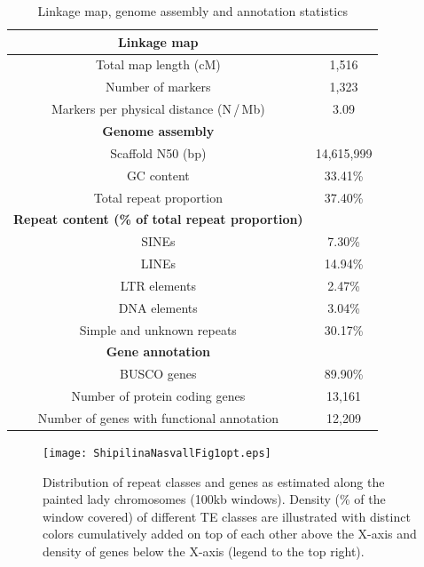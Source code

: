 \documentclass[twocolumn]{bmcart}%
\begin{document}
\begin{table}[h!]
\caption{Linkage map, genome assembly and annotation statistics}
\label{tab:1} %
  \begin{tabular}{cc}
    \hline
    \textbf{Linkage map}
     &    \\ \hline
    Total map length (cM) & 1,516 \\
    Number of markers & 1,323 \\
    Markers per physical distance (N\,/\,Mb) & 3.09  \\ \hline
      \textbf{Genome assembly}
     &    \\ \hline
   Scaffold N50 (bp) & 14,615,999 \\
   GC content & 33.41\% \\
   Total repeat proportion & 37.40\%  \\ \hline
         \textbf{Repeat content (\% of total repeat proportion)}
     &    \\ \hline
   SINEs & 7.30\% \\
   LINEs & 14.94\% \\
   LTR elements & 2.47\%  \\ 
   DNA elements & 3.04\% \\
   Simple and unknown repeats & 30.17\% \\ \hline
 \textbf{Gene annotation}  &    \\ \hline  
   BUSCO genes & 89.90\% \\
Number of protein coding genes & 13,161 \\
Number of genes with functional annotation & 12,209 \\ \hline
  \end{tabular}
\end{table}

\begin{figure}[p]
  \caption{Distribution of repeat classes and genes as estimated along the painted lady chromosomes (100kb windows). Density (\% of the window covered) of different TE classes are illustrated with distinct colors cumulatively added on top of each other above the X-axis and density of genes below the X-axis (legend to the top right).}
  \label{fig:1} %
  \texttt{[image: ShipilinaNasvallFig1opt.eps]}
\end{figure}
\end{document}
